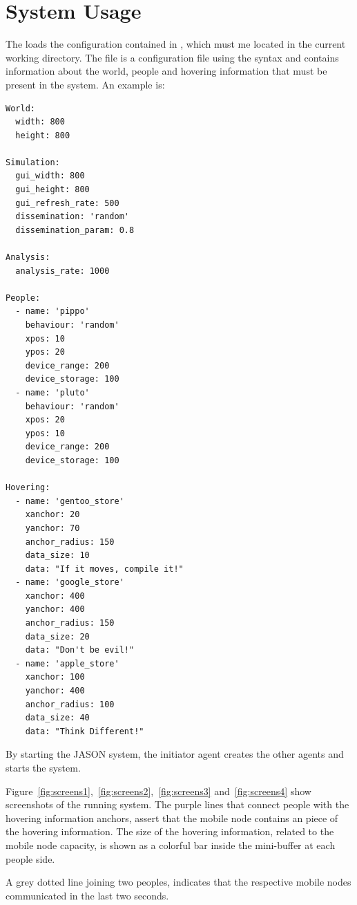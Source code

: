 \section{System Usage}
\label{sec:usage}

The  loads the configuration contained in
, which must me located in the current working directory.
The file is a configuration file using the  syntax and contains
information about the world, people and hovering information that must be
present in the system. An example is:

\begin{lstlisting}
World:
  width: 800
  height: 800

Simulation:
  gui_width: 800
  gui_height: 800
  gui_refresh_rate: 500
  dissemination: 'random'
  dissemination_param: 0.8

Analysis:
  analysis_rate: 1000

People:
  - name: 'pippo'
    behaviour: 'random'
    xpos: 10
    ypos: 20
    device_range: 200
    device_storage: 100
  - name: 'pluto'
    behaviour: 'random'
    xpos: 20
    ypos: 10
    device_range: 200
    device_storage: 100

Hovering:
  - name: 'gentoo_store'
    xanchor: 20
    yanchor: 70
    anchor_radius: 150
    data_size: 10
    data: "If it moves, compile it!"
  - name: 'google_store'
    xanchor: 400
    yanchor: 400
    anchor_radius: 150
    data_size: 20
    data: "Don't be evil!"
  - name: 'apple_store'
    xanchor: 100
    yanchor: 400
    anchor_radius: 100
    data_size: 40
    data: "Think Different!"
\end{lstlisting}

By starting the JASON system, the initiator agent creates the other agents and
starts the system.

Figure~\ref{fig:screens1},~\ref{fig:screens2},~\ref{fig:screens3}
and~\ref{fig:screens4} show screenshots of the running system. The purple
lines that connect people with the hovering information anchors, assert that the
mobile node contains an piece of the hovering information. The size of the hovering
information, related to the mobile node capacity, is shown as a colorful bar inside
the mini-buffer at each people side.

A grey dotted line joining two peoples, indicates that the respective mobile
nodes communicated in the last two seconds.


